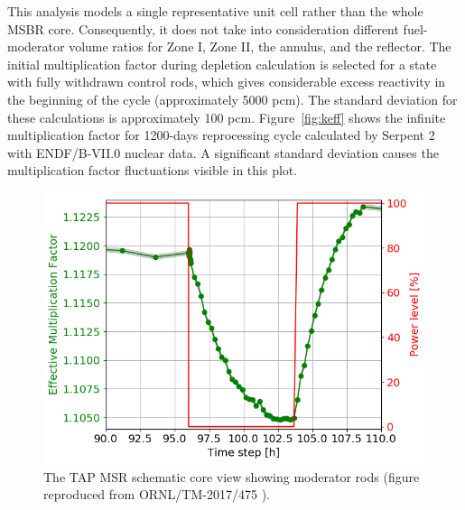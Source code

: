 \documentclass{anstrans}
\begin{document}
This analysis models a single representative unit cell rather than the whole 
\gls{MSBR} core. Consequently, it does not take into consideration different 
fuel-moderator volume ratios for Zone I, Zone II, the annulus, and the reflector. The 
initial multiplication factor during depletion calculation is selected for 
a state with fully withdrawn control rods, which gives 
considerable excess reactivity in the beginning of the cycle (approximately 5000 pcm). 
The standard deviation for these calculations is approximately 100 pcm. Figure~\ref{fig:keff} 
shows the infinite multiplication factor for 1200-days reprocessing cycle calculated by 
Serpent 2 with ENDF/B-VII.0 nuclear data. A significant standard deviation causes the 
multiplication factor fluctuations visible in this plot.

\begin{figure}[htbp!] %
	\centering
	\includegraphics[width=\linewidth]{pwr_keff_zoomed.png}
	\caption{The \gls{TAP} \gls{MSR} schematic core view showing moderator 
		rods (figure reproduced from ORNL/TM-2017/475 
		\cite{betzler_assessment_2017}).}
	\label{fig:zoneI}
\end{figure}
\end{document}
